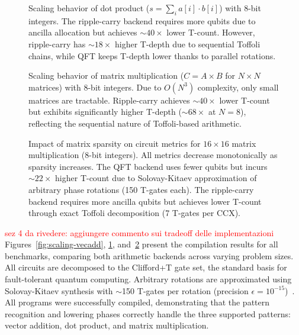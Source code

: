 \begin{figure}[t]
   \centering
   
   \caption{Scaling behavior of dot product ($s = \sum_i a[i] \cdot b[i]$) with 8-bit integers. The ripple-carry backend requires more qubits due to ancilla allocation but achieves ${\sim}40\times$ lower T-count. However, ripple-carry has ${\sim}18\times$ higher T-depth due to sequential Toffoli chains, while QFT keeps T-depth lower thanks to parallel rotations.}
  \label{fig:scaling-vecdot}
\end{figure}

\begin{figure}[t]
   \centering
   
   \caption{Scaling behavior of matrix multiplication ($C = A \times B$ for $N \times N$ matrices) with 8-bit integers. Due to $O(N^3)$ complexity, only small matrices are tractable. Ripple-carry achieves ${\sim}40\times$ lower T-count but exhibits significantly higher T-depth (${\sim}68\times$ at $N{=}8$), reflecting the sequential nature of Toffoli-based arithmetic.}
  \label{fig:scaling-matmul}
\end{figure}


\begin{figure}[t]
    \centering
    
    \caption{Impact of matrix sparsity on circuit metrics for $16 \times 16$ matrix multiplication (8-bit integers). All metrics decrease monotonically as sparsity increases. The QFT backend uses fewer qubits but incurs ${\sim}22\times$ higher T-count due to Solovay-Kitaev approximation of arbitrary phase rotations (150 T-gates each). The ripple-carry backend requires more ancilla qubits but achieves lower T-count through exact Toffoli decomposition (7 T-gates per CCX).}
\label{fig:sparsity}
\end{figure}


\textcolor{red}{sez 4 da rivedere: aggiungere commento sui tradeoff delle implementazioni}
Figures~\ref{fig:scaling-vecadd}, \ref{fig:scaling-vecdot}, and~\ref{fig:scaling-matmul} present the compilation results for all benchmarks, comparing both arithmetic backends across varying problem sizes. All circuits are decomposed to the Clifford+T gate set, the standard basis for fault-tolerant quantum computing. Arbitrary rotations are approximated using Solovay-Kitaev synthesis with $\sim$150 T-gates per rotation (precision $\epsilon = 10^{-15}$)~\cite{ross2014optimal}. All programs were successfully compiled, demonstrating that the pattern recognition and lowering phases correctly handle the three supported patterns: vector addition, dot product, and matrix multiplication.


